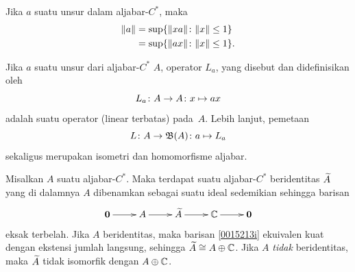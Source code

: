 \begin{prop}\label{001315} Jika $a$ suatu unsur dalam aljabar-$C^*$, maka
  \begin{align*}
    \lVert a\rVert &= \sup\{\lVert xa\rVert\colon \lVert x\rVert \le 1\} \\
             &= \sup\{\lVert ax\rVert\colon \lVert x\rVert \le 1\}.
  \end{align*}
\end{prop}

\begin{cor}\label{0013151} Jika $a$ suatu unsur dari aljabar-$C^*$ $A$, operator $L_a$,
yang disebut
 dan didefinisikan oleh
   \[ L_a\colon A \rightarrow A\colon x \mapsto ax \]
adalah suatu operator (linear terbatas) pada~$A$. Lebih lanjut, pemetaan
   \[ L\colon A \rightarrow \mathfrak{B}(A)\colon a \mapsto L_a \]
sekaligus merupakan isometri dan homomorfisme aljabar.
\end{cor}

\begin{prop}\label{0015213} Misalkan $A$ suatu aljabar-$C^*$. Maka terdapat suatu
aljabar-$C^*$ beridentitas $\widetilde{A}$ yang di dalamnya $A$ dibenamkan sebagai suatu ideal
sedemikian sehingga barisan
 \begin{equation}\label{0015213i}
   \xymatrix{
     \vc 0\ar[r] & A\ar[r] & \wt A \ar[r] & \C \ar[r] & \vc 0
 }\end{equation}
eksak terbelah. Jika $A$ beridentitas, maka barisan \eqref{0015213i} ekuivalen kuat dengan
ekstensi jumlah langsung, sehingga $\widetilde{A} \cong A \oplus \mathbb{C}$. Jika $A$ \emph{tidak}
beridentitas, maka $\widetilde{A}$ tidak isomorfik dengan $A \oplus \mathbb{C}$.
\end{prop}

